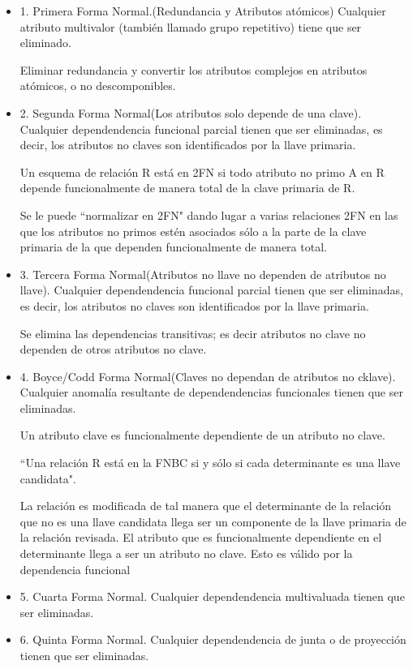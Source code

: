 \documentclass[12pt, fleqn]{report}                             %
\theoremstyle{break}                                            %
\begin{document}
    \begin{itemize}
        \item 1. Primera Forma Normal.(Redundancia y Atributos atómicos)
Cualquier atributo multivalor (también llamado grupo repetitivo) tiene que ser
eliminado.

Eliminar redundancia y convertir los
atributos complejos en atributos atómicos, o no descomponibles.


\item 2. Segunda Forma Normal(Los atributos solo depende de una clave).
Cualquier dependendencia funcional parcial tienen que ser eliminadas, es decir,
los atributos no claves son identificados por la llave primaria.

Un esquema de relación R está en 2FN si todo atributo no primo A en R depende
funcionalmente de manera total de la clave primaria de R.

Se le puede “normalizar en 2FN"
dando lugar a varias relaciones 2FN en las que los atributos no primos estén
asociados sólo a la parte de la clave primaria de la que dependen funcionalmente de manera total.


\item 3. Tercera Forma Normal(Atributos no llave no dependen de atributos no llave).
Cualquier dependendencia funcional parcial tienen que ser eliminadas, es decir,
los atributos no claves son identificados por la llave primaria.

Se elimina las dependencias transitivas; es decir atributos no clave no
dependen de otros atributos no clave.
\item 4. Boyce/Codd Forma Normal(Claves no dependan de atributos no cklave).
Cualquier anomalía resultante de dependendencias funcionales tienen que ser
eliminadas.

Un atributo clave  es funcionalmente dependiente de un atributo no clave.

“Una relación R está en la FNBC si y sólo si cada determinante es una llave
candidata".

La relación es modificada de tal manera que el determinante de la relación que
no es una llave candidata llega ser un componente de la llave primaria de la
relación revisada. El atributo que es funcionalmente dependiente en el
determinante llega a ser un atributo no clave. Esto es válido por la dependencia
funcional
\item 5. Cuarta Forma Normal.
Cualquier dependendencia multivaluada tienen que ser eliminadas.
\item 6. Quinta Forma Normal.
Cualquier dependendencia de junta o de proyección tienen que ser eliminadas.
    \end{itemize}
\end{document}
